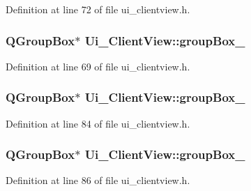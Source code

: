 Definition at line 72 of file ui\+\_\+clientview.\+h.

\hypertarget{class_ui___client_view_a7ca21148a8e0fbaad7a8f2ec0ccf0926}{}
\subsubsection[{group\+Box\+\_\+4}]{\setlength{\rightskip}{0pt plus 5cm}Q\+Group\+Box$\ast$ Ui\+\_\+\+Client\+View\+::group\+Box\+\_}\label{class_ui___client_view_a7ca21148a8e0fbaad7a8f2ec0ccf0926}


Definition at line 69 of file ui\+\_\+clientview.\+h.

\hypertarget{class_ui___client_view_a216081f1bbb11729d0ecff74ecb3e705}{}
\subsubsection[{group\+Box\+\_\+5}]{\setlength{\rightskip}{0pt plus 5cm}Q\+Group\+Box$\ast$ Ui\+\_\+\+Client\+View\+::group\+Box\+\_}\label{class_ui___client_view_a216081f1bbb11729d0ecff74ecb3e705}


Definition at line 84 of file ui\+\_\+clientview.\+h.

\hypertarget{class_ui___client_view_a62a75df620b063d5bd67f65a201f5657}{}
\subsubsection[{group\+Box\+\_\+6}]{\setlength{\rightskip}{0pt plus 5cm}Q\+Group\+Box$\ast$ Ui\+\_\+\+Client\+View\+::group\+Box\+\_}\label{class_ui___client_view_a62a75df620b063d5bd67f65a201f5657}


Definition at line 86 of file ui\+\_\+clientview.\+h.

\hypertarget{class_ui___client_view_a3c3b68713d02d91d0e03bbb7606d8d87}{}
